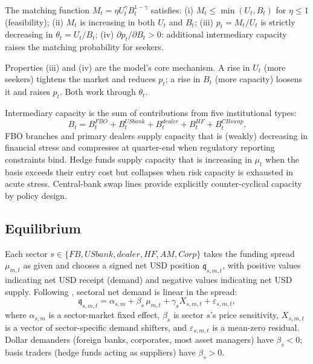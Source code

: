 \begin{lemma}
  \label{lem:matching}
  The matching function $M_t = \eta U_t^{\gamma} B_t^{1-\gamma}$ satisfies:
  (i) $M_t \leq \min(U_t, B_t)$ for $\eta \leq 1$ (feasibility); (ii) $M_t$
  is increasing in both $U_t$ and $B_t$; (iii) $p_t = M_t / U_t$ is strictly
  decreasing in $\theta_t = U_t / B_t$; (iv) $\partial p_t / \partial B_t > 0$:
  additional intermediary capacity raises the matching probability for seekers.
\end{lemma}

Properties (iii) and (iv) are the model's core mechanism. A rise in $U_t$ (more
seekers) tightens the market and reduces $p_t$; a rise in $B_t$ (more capacity)
loosens it and raises $p_t$. Both work through $\theta_t$.

Intermediary capacity is the sum of contributions from five institutional types:
\begin{equation}
  B_t = B_t^{FBO} + B_t^{USbank} + B_t^{dealer} + B_t^{HF} + B_t^{CBswap}.
  \label{eq:capacity}
\end{equation}
FBO branches and primary dealers supply capacity that is (weakly) decreasing in
financial stress and compresses at quarter-end when regulatory reporting
constraints bind. Hedge funds supply capacity that is increasing in $\mu_t$ when
the basis exceeds their entry cost but collapses when risk capacity is exhausted
in acute stress. Central-bank swap lines provide explicitly counter-cyclical
capacity by policy design.


\subsection{Equilibrium}
\label{subsec:equilibrium}

Each sector $s \in \{FB, USbank, dealer, HF, AM, Corp\}$ takes the funding
spread $\mu_{m,t}$ as given and chooses a signed net USD position
$\mathfrak{q}_{s,m,t}$, with positive values indicating net USD receipt (demand)
and negative values indicating net USD supply. Following \citet{KoijenYogo2019},
sectoral net demand is linear in the spread:
\begin{equation}
  \mathfrak{q}_{s,m,t} = \alpha_{s,m} + \beta_s\,\mu_{m,t} +
  \gamma_s X_{s,m,t} + \varepsilon_{s,m,t},
  \label{eq:net-demand}
\end{equation}
where $\alpha_{s,m}$ is a sector-market fixed effect, $\beta_s$ is sector $s$'s
price sensitivity, $X_{s,m,t}$ is a vector of sector-specific demand shifters,
and $\varepsilon_{s,m,t}$ is a mean-zero residual. Dollar demanders (foreign
banks, corporates, most asset managers) have $\beta_s < 0$; basis traders (hedge
funds acting as suppliers) have $\beta_s > 0$.

